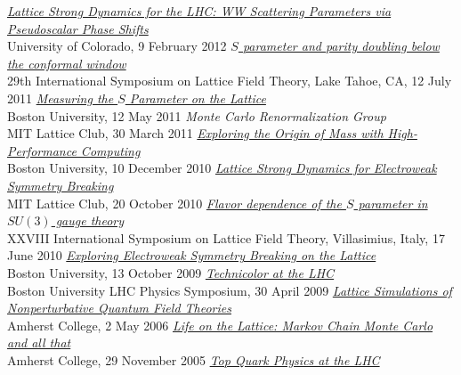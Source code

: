 \begin{spacelistout}
\begin{revnumerate}
    \pagebreakitem
      \textit{\href{http://www.davidschaich.net/talks/1202WW.pdf}{Lattice Strong Dynamics for the LHC: WW Scattering Parameters via Pseudoscalar Phase Shifts}} \\
      University of Colorado, 9 February 2012
    \pagebreakitem
      \textit{\href{http://www.davidschaich.net/talks/Lattice11.pdf}{$S$ parameter and parity doubling below the conformal window}} \\
      29th International Symposium on Lattice Field Theory, Lake Tahoe, CA, 12 July 2011
    \pagebreakitem
      \textit{\href{http://www.davidschaich.net/talks/defense.pdf}{Measuring the $S$ Parameter on the Lattice}} \\
      Boston University, 12 May 2011
    \pagebreakitem
      \textit{Monte Carlo Renormalization Group} \\
      MIT Lattice Club, 30 March 2011
    \pagebreakitem
      \textit{\href{http://www.davidschaich.net/talks/BUseminar.pdf}{Exploring the Origin of Mass with High-Performance Computing}} \\
      Boston University, 10 December 2010
    \pagebreakitem
      \textit{\href{http://www.davidschaich.net/talks/1010MIT.pdf}{Lattice Strong Dynamics for Electroweak Symmetry Breaking}} \\
      MIT Lattice Club, 20 October 2010
    \pagebreakitem
      \textit{\href{http://www.davidschaich.net/talks/Lattice10.pdf}{Flavor dependence of the $S$ parameter in $SU(3)$ gauge theory}} \\
      XXVIII International Symposium on Lattice Field Theory, Villasimius, Italy, 17 June 2010
    \pagebreakitem
      \textit{\href{http://www.davidschaich.net/talks/EWSB_lattice.pdf}{Exploring Electroweak Symmetry Breaking on the Lattice}} \\
      Boston University, 13 October 2009
    \pagebreakitem
      \textit{\href{http://www.davidschaich.net/talks/TC_LHC.pdf}{Technicolor at the LHC}} \\
      Boston University LHC Physics Symposium, 30 April 2009
    \pagebreakitem
      \textit{\href{http://www.davidschaich.net/talks/thesisDefense.pdf}{Lattice Simulations of Nonperturbative Quantum Field Theories}} \\
      Amherst College, 2 May 2006
    \pagebreakitem
      \textit{\href{http://www.davidschaich.net/talks/thesisTalk.pdf}{Life on the Lattice: Markov Chain Monte Carlo and all that}} \\
      Amherst College, 29 November 2005
    \pagebreakitem
      \textit{\href{http://www.davidschaich.net/talks/topMass.pdf}{Top Quark Physics at the LHC}} \\

\end{revnumerate}
\end{spacelistout}
